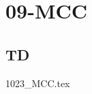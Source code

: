 \clearpage
\chapter{09-MCC}

\section{TD}

\setcounter{question}{0}
{}
\graphicspath{{../09-MCC/TD/1023_MCC/images/}{../09-MCC/TD/1023_MCC/}{../Style/png/}}
{1023_MCC.tex}

